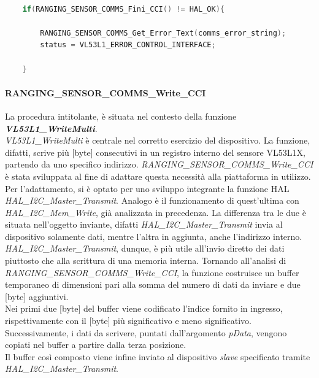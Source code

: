 \documentclass[11pt]{report}
\begin{document}
\begin{lstlisting}[language=Cpp, caption={Dettaglio sull'invocazione di \textit{RANGING\_SENSOR\_COMMS\_Fini\_CCI} in \textit{VL53L1\_CommsClose}}]
    
    if(RANGING_SENSOR_COMMS_Fini_CCI() != HAL_OK){

        RANGING_SENSOR_COMMS_Get_Error_Text(comms_error_string);
        status = VL53L1_ERROR_CONTROL_INTERFACE;

    }
\end{lstlisting}

\paragraph{RANGING\_SENSOR\_COMMS\_Write\_CCI}
La procedura intitolante, è situata nel contesto della funzione \textbf{\textit{VL53L1\_WriteMulti}}.\\
\textit{VL53L1\_WriteMulti} è centrale nel corretto esercizio del dispositivo. La funzione, difatti, scrive più [byte] consecutivi in un registro interno del sensore VL53L1X, partendo da uno specifico indirizzo.
\textit{RANGING\_SENSOR\_COMMS\_Write\_CCI} è stata sviluppata al fine di adattare questa necessità alla piattaforma in utilizzo.\\
Per l'adattamento, si è optato per uno sviluppo integrante la funzione HAL\\\textit{HAL\_I2C\_Master\_Transmit}. Analogo è il funzionamento di quest'ultima con\\\textit{HAL\_I2C\_Mem\_Write}, già analizzata in precedenza.
La differenza tra le due è situata nell'oggetto inviante, difatti \textit{HAL\_I2C\_Master\_Transmit} invia al dispositivo solamente dati, mentre l'altra in aggiunta, anche l'indirizzo interno. \textit{HAL\_I2C\_Master\_Transmit}, dunque, è più utile all'invio diretto dei dati piuttosto che alla scrittura di una memoria interna.
Tornando all'analisi di \textit{RANGING\_SENSOR\_COMMS\_Write\_CCI}, la funzione costruisce un buffer temporaneo di dimensioni pari alla somma del numero di dati da inviare e due [byte] aggiuntivi.\\
Nei primi due [byte] del buffer viene codificato l'indice fornito in ingresso, rispettivamente con il [byte] più significativo e meno significativo.\\
Successivamente, i dati da scrivere, puntati dall'argomento \textit{pData}, vengono copiati nel buffer a partire dalla terza posizione.\\
Il buffer così composto viene infine inviato al dispositivo \textit{slave} specificato tramite\\\textit{HAL\_I2C\_Master\_Transmit}.
\end{document}
